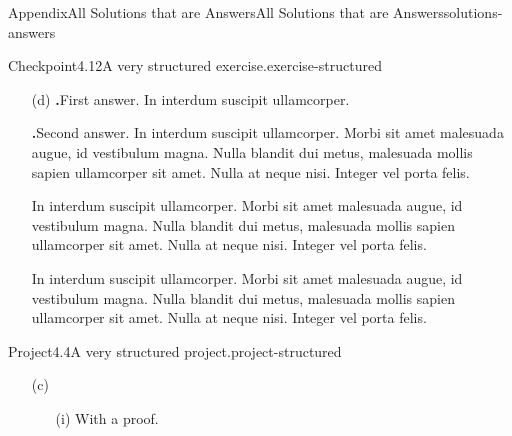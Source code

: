 \documentclass[twoside,10pt,]{article}
\newcommand{\blocktitlefont}{\relax}
\newcommand{\mono}[1]{\texttt{#1}}
\newcommand{\lititle}[1]{{\slshape#1}}
\numberwithin{equation}{section}
\begin{document}
\begin{solutions-section}{Appendix}{All Solutions that are Answers}{}{All Solutions that are Answers}{}{}{solutions-answers}
\begin{inlinesolution}{Checkpoint}{4.12}{A very structured exercise.}{exercise-structured}
\begin{enumerate}[font=\bfseries,label=(\alph*),ref=\alph*]
\begin{enumerate}[font=\bfseries,label=(\roman*),ref=\theenumi.\roman*]
\item[(i)]\lititle{A task with a title and an \mono{<answer>} for the Solutions.}\par%
\par\smallskip%
\noindent\hypertarget{exercise-structured-5-3-3-back}{}With a proof.%
\begin{solutionproof}{Proof}
In interdum suscipit ullamcorper. Morbi sit amet malesuada augue, id vestibulum magna. Nulla blandit dui metus, malesuada mollis sapien ullamcorper sit amet. Nulla at neque nisi. Integer vel porta felis.%
\end{solutionproof}
And a bit more to say.%
\item[(ii)]\noindent\hypertarget{exercise-structured-5-4-2-back}{}Right!  In interdum suscipit ullamcorper. Morbi sit amet malesuada augue, id vestibulum magna. Nulla blandit dui metus, malesuada mollis sapien ullamcorper sit amet. Nulla at neque nisi. Integer vel porta felis.%
\end{enumerate}%
\item[(d)]\noindent\textbf{\blocktitlefont 1.}\hypertarget{exercise-structured-6-3-back}{}\quad{}First answer.  In interdum suscipit ullamcorper.%
\par\smallskip%
\noindent\textbf{\blocktitlefont 2.}\hypertarget{exercise-structured-6-4-back}{}\quad{}Second answer.  In interdum suscipit ullamcorper. Morbi sit amet malesuada augue, id vestibulum magna. Nulla blandit dui metus, malesuada mollis sapien ullamcorper sit amet. Nulla at neque nisi. Integer vel porta felis.%
\par
In interdum suscipit ullamcorper. Morbi sit amet malesuada augue, id vestibulum magna. Nulla blandit dui metus, malesuada mollis sapien ullamcorper sit amet. Nulla at neque nisi. Integer vel porta felis.%
\par
In interdum suscipit ullamcorper. Morbi sit amet malesuada augue, id vestibulum magna. Nulla blandit dui metus, malesuada mollis sapien ullamcorper sit amet. Nulla at neque nisi. Integer vel porta felis.%
\end{enumerate}%
\end{inlinesolution}%
\begin{projectsolution}{Project}{4.4}{A very structured project.}{project-structured}%
\begin{enumerate}[font=\bfseries,label=(\alph*),ref=\alph*]%
\item[(c)]\begin{enumerate}[font=\bfseries,label=(\roman*),ref=\theenumi.\roman*]%
\item[(i)]\noindent\hypertarget{project-structured-6-2-2-back}{}With a proof.%

\end{enumerate}
\end{enumerate}
\end{projectsolution}
\end{solutions-section}
\end{document}
